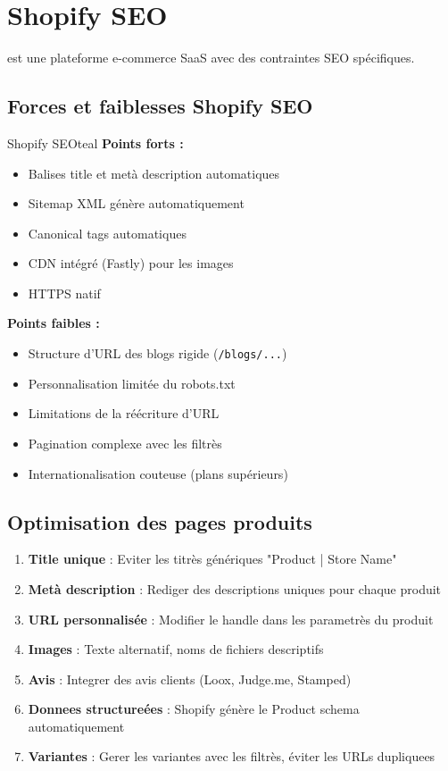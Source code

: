 \section{Shopify SEO}

 est une plateforme e-commerce SaaS avec des contraintes SEO spécifiques.

\subsection{Forces et faiblesses Shopify SEO}

\begin{mybox}{Shopify SEO}{teal}
\textbf{Points forts :}
\begin{itemize}
    \item Balises title et metà description automatiques
    \item Sitemap XML génère automatiquement
    \item Canonical tags automatiques
    \item CDN intégré (Fastly) pour les images
    \item HTTPS natif
\end{itemize}
\textbf{Points faibles :}
\begin{itemize}
    \item Structure d'URL des blogs rigide (\texttt{/blogs/...})
    \item Personnalisation limitée du robots.txt
    \item Limitations de la réécriture d'URL
    \item Pagination complexe avec les filtrès
    \item Internationalisation couteuse (plans supérieurs)
\end{itemize}
\end{mybox}

\subsection{Optimisation des pages produits}

\begin{enumerate}
    \item \textbf{Title unique} : Eviter les titrès génériques "Product | Store Name"
    \item \textbf{Metà description} : Rediger des descriptions uniques pour chaque produit
    \item \textbf{URL personnalisée} : Modifier le handle dans les parametrès du produit
    \item \textbf{Images} : Texte alternatif, noms de fichiers descriptifs
    \item \textbf{Avis} : Integrer des avis clients (Loox, Judge.me, Stamped)
    \item \textbf{Donnees structureées} : Shopify génère le Product schema automatiquement
    \item \textbf{Variantes} : Gerer les variantes avec les filtrès, éviter les URLs dupliquees
\end{enumerate}

